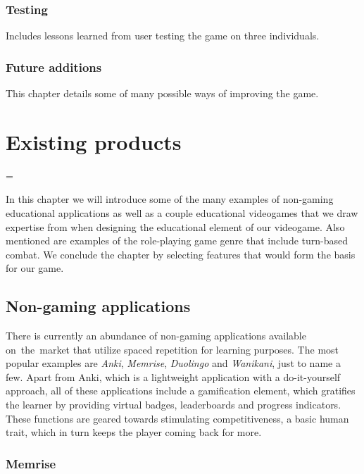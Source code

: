 \documentclass[thesis=B,english,hidelinks]{FITthesisXE}[2012/06/26]
\begin{document}
\begin{introduction}
\subsection{Testing}

Includes lessons learned from user testing the game on three individuals.

\subsection{Future additions}

This chapter details some of many possible ways of improving the game.

\end{introduction}

\chapter{Existing products}

\emergencystretch=\maxdimen
{}

In this chapter we will introduce some of the many examples of non-gaming educational applications as well as a couple educational videogames that we draw expertise from when designing the educational element of our videogame. Also mentioned are examples of the role-playing game genre that include turn-based combat. We conclude the chapter by selecting features that would form the basis for our game.

\section{Non-gaming applications}

There is currently an abundance of non-gaming applications available on~the~market that utilize spaced repetition for learning purposes. The most popular examples are \emph{Anki}\autocite{anki}, \emph{Memrise}\autocite{memrise}, \emph{Duolingo}\autocite{duolingo} and \emph{Wanikani}\autocite{wanikani}, just to name a few. Apart from Anki, which is a lightweight application with a do-it-yourself approach, all of these applications include a gamification element, which gratifies the learner by providing virtual badges, leaderboards and progress indicators. These functions are geared towards stimulating competitiveness, a basic human trait, which in turn keeps the player coming back for more.

\subsection{Memrise}
\end{document}
